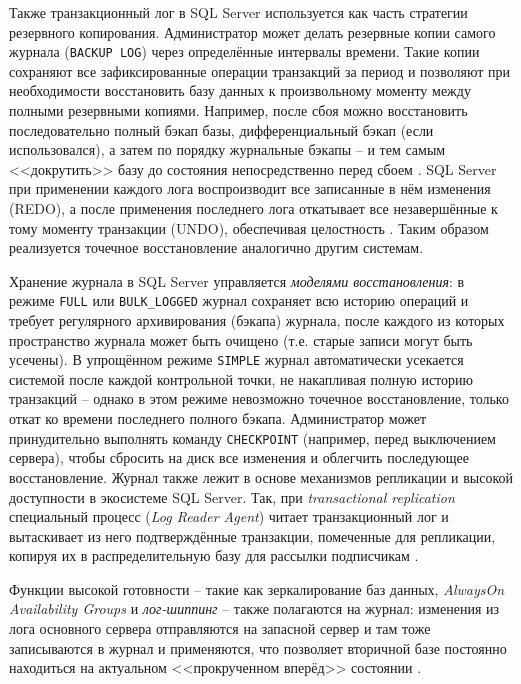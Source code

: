  Также транзакционный лог в SQL Server используется как часть стратегии резервного копирования. Администратор может делать резервные копии самого журнала (\texttt{BACKUP LOG}) через определённые интервалы времени. Такие копии сохраняют все зафиксированные операции транзакций за период и позволяют при необходимости восстановить базу данных к произвольному моменту между полными резервными копиями. Например, после сбоя можно восстановить последовательно полный бэкап базы, дифференциальный бэкап (если использовался), а затем по порядку журнальные бэкапы – и тем самым <<докрутить>> базу до состояния непосредственно перед сбоем \autocite{MicrosoftLearnSQLserverTransLog}. SQL Server при применении каждого лога воспроизводит все записанные в нём изменения (REDO), а после применения последнего лога откатывает все незавершённые к тому моменту транзакции (UNDO), обеспечивая целостность \autocite{MicrosoftLearnSQLserverTransLog}. Таким образом реализуется точечное восстановление аналогично другим системам. 
 
 Хранение журнала в SQL Server управляется \textit{моделями восстановления}: в режиме \texttt{FULL} или \texttt{BULK\_LOGGED} журнал сохраняет всю историю операций и требует регулярного архивирования (бэкапа) журнала, после каждого из которых пространство журнала может быть очищено (т.е. старые записи могут быть усечены). В упрощённом режиме \texttt{SIMPLE} журнал автоматически усекается системой после каждой контрольной точки, не накапливая полную историю транзакций – однако в этом режиме невозможно точечное восстановление, только откат ко времени последнего полного бэкапа. Администратор может принудительно выполнять команду \texttt{CHECKPOINT} (например, перед выключением сервера), чтобы сбросить на диск все изменения и облегчить последующее восстановление. Журнал также лежит в основе механизмов репликации и высокой доступности в экосистеме SQL Server. Так, при \textit{transactional replication} специальный процесс (\textit{Log Reader Agent}) читает транзакционный лог и вытаскивает из него подтверждённые транзакции, помеченные для репликации, копируя их в распределительную базу для рассылки подписчикам \autocite{MicrosoftLearnSQLserverTransLog}. 
 
 Функции высокой готовности – такие как зеркалирование баз данных, \textit{AlwaysOn Availability Groups} и \textit{лог-шиппинг} – также полагаются на журнал: изменения из лога основного сервера отправляются на запасной сервер и там тоже записываются в журнал и применяются, что позволяет вторичной базе постоянно находиться на актуальном <<прокрученном вперёд>> состоянии \autocite{MicrosoftLearnSQLserverTransLog}.

